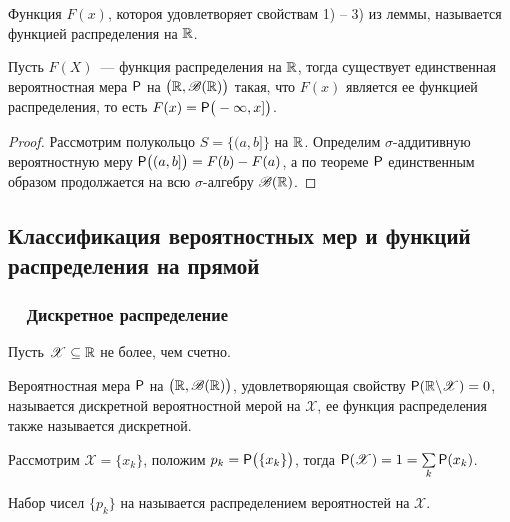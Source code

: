 \begin{definition}
	Функция $F(x)$, котороя удовлетворяет свойствам 1) -- 3) из леммы, называется функцией распределения на $\R$.
\end{definition}
\begin{theorem}
	Пусть $F(X)$~--- функция распределения на $\R$, тогда существует единственная вероятностная мера $\P$ на $\big(\R, \B(\R) \big)$ такая, что $F(x)$ является ее функцией распределения, то есть $F(x) = \P \big(-\infty, x] \big)$.
	\begin{proof}
		Рассмотрим полукольцо $ S = \big\{ (a, b] \big\}$ на $\R$. Определим $\sigma$-аддитивную вероятностную меру $\P \big( (a, b] \big) = F(b) - F(a)$, а по теореме $\P$ единственным образом продолжается на всю $\sigma$-алгебру $\B(\R)$.
	\end{proof}
\end{theorem}
\subsection{Классификация вероятностных мер и функций распределения на прямой}
\subsubsection*{~~Дискретное распределение}
Пусть $\mathscr{X} \subseteq \R$ не более, чем счетно.
\begin{definition}
	Вероятностная мера $\P$ на $\big( \R, \B(\R) \big)$, удовлетворяющая свойству $\P(\R \backslash \mathscr{X}) = 0$, называется дискретной вероятностной мерой на $\mathscr{X}$, ее функция распределения также называется дискретной.
\end{definition}

Рассмотрим $\mathscr{X} = \{ x_k \}$, положим $p_k = \P \big( \{x_k \} \big)$, тогда $\P( \mathscr{X} ) = 1 = \sum\limits_{k} \P ( x_k )$.

\begin{definition}
	Набор чисел $\{ p_k \}$ на называется распределением вероятностей на $\mathscr{X}$.
\end{definition}

